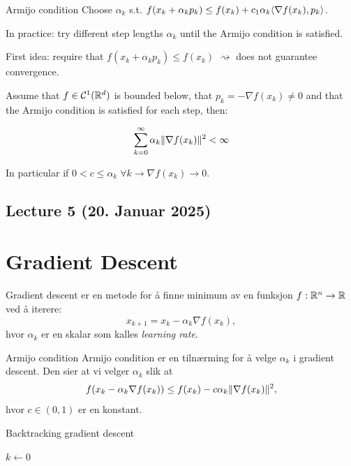 \begin{definition}{Armijo condition}{}
    Choose  \(\alpha_k\) s.t.  \(f(x_k + \alpha_k p_k) \leq f(x_k) + c_1 \alpha_k \langle\nabla f(x_k), p_k\rangle\).
\end{definition}

In practice: try different step lengths  \(\alpha_k\) until the Armijo condition is satisfied.

First idea: require that  \(f(x_k + \alpha_k p_k) \leq f(x_k)\)  \(\rightsquigarrow\) does not guarantee convergence.

\begin{lemma}{}{}
    Assume that  \(f \in \mathcal{C}^1(\mathbb{R}^d)\) is bounded below, that  \(p_k = - \nabla f(x_k) \neq 0\) and that the Armijo condition is satisfied for each step, then:

    \[
        \sum_{k=0}^{\infty} \alpha_k \lVert\nabla f(x_k)\rVert^2 < \infty
    \]

    In particular if  \(0 < c \leq \alpha_k \; \forall k \rightarrow \nabla f(x_k) \rightarrow 0\).
\end{lemma}



\subsection{Lecture 5 (20. Januar 2025)}

\section*{Gradient Descent}


Gradient descent er en metode for å finne minimum av en funksjon  \(f: \mathbb{R}^n \to \mathbb{R}\) ved å iterere:
\[
    x_{k+1} = x_k - \alpha_k \nabla f(x_k),
\]
hvor  \(\alpha_k\) er en skalar som kalles \emph{learning rate}.

\begin{remark}{Armijo condition}{}
    Armijo condition er en tilnærming for å velge  \(\alpha_k\) i gradient descent. Den sier at vi velger  \(\alpha_k\) slik at
    \[
        f(x_k - \alpha_k \nabla f(x_k)) \leq f(x_k) - c \alpha_k \lVert\nabla f(x_k)\rVert^2,
    \]
    hvor  \(c \in (0, 1)\) er en konstant.
\end{remark}


\begin{algorithm}
    \caption{Backtracking gradient descent}
    \SetAlgoLined
     \(k \gets 0\)\;
\end{algorithm}


